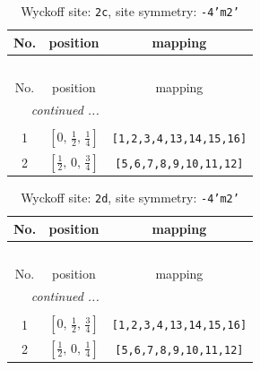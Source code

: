 \documentclass[fleqn,8pt]{jsarticle}
\begin{document}
\renewcommand{\arraystretch}{1.2}
\begin{longtable}{ccc}
\caption{Wyckoff site: {\tt 2c}, site symmetry: {\tt -4'm2'}}
 \\
 \hline \hline
No. & position & mapping \\ \hline \endfirsthead

\multicolumn{2}{l}{\tablename\ \thetable{}} \\
 \hline \hline
No. & position & mapping \\ \hline \endhead

 \hline \hline
\multicolumn{2}{r}{\footnotesize\it continued ...} \\ \endfoot

 \hline \hline
\multicolumn{2}{r}{} \\ \endlastfoot

1 & $\left[ 0,\, \frac{1}{2},\, \frac{1}{4} \right]$ & {\tt [1,2,3,4,13,14,15,16]} \\ \hline
2 & $\left[ \frac{1}{2},\, 0,\, \frac{3}{4} \right]$ & {\tt [5,6,7,8,9,10,11,12]} \\
\end{longtable}
\renewcommand{\arraystretch}{1.2}
\begin{longtable}{ccc}
\caption{Wyckoff site: {\tt 2d}, site symmetry: {\tt -4'm2'}}
 \\
 \hline \hline
No. & position & mapping \\ \hline \endfirsthead

\multicolumn{2}{l}{\tablename\ \thetable{}} \\
 \hline \hline
No. & position & mapping \\ \hline \endhead

 \hline \hline
\multicolumn{2}{r}{\footnotesize\it continued ...} \\ \endfoot

 \hline \hline
\multicolumn{2}{r}{} \\ \endlastfoot

1 & $\left[ 0,\, \frac{1}{2},\, \frac{3}{4} \right]$ & {\tt [1,2,3,4,13,14,15,16]} \\ \hline
2 & $\left[ \frac{1}{2},\, 0,\, \frac{1}{4} \right]$ & {\tt [5,6,7,8,9,10,11,12]} \\
\end{longtable}
\renewcommand{\arraystretch}{1.2}
\end{document}
